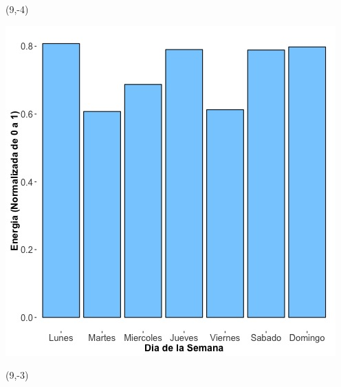 \documentclass{article}\usepackage[]{graphicx}\usepackage[]{color}
\newenvironment{knitrout}{}{} %
\begin{document}
 \begin{textblock}{1}(9,-4)
\begin{minipage}{20em}
\begingroup

\endgroup
\end{minipage}
\end{textblock}


\begin{knitrout}
\color{fgcolor}
\includegraphics[scale=0.65]{figure/A22_day_of_week_plot} 
\end{knitrout}


 \begin{textblock}{1}(9,-3)
\begin{minipage}{20em}
\begingroup

\endgroup
\end{minipage}
\end{textblock}
\end{document}

